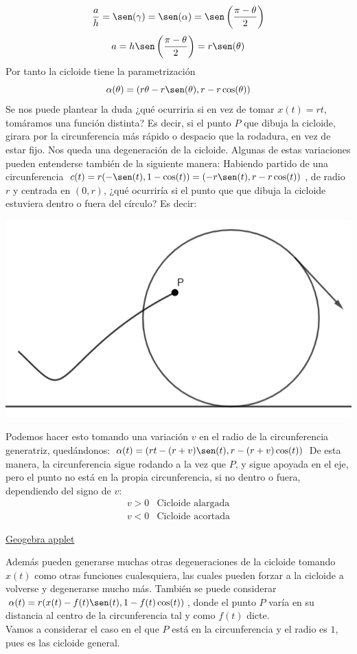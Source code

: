 \documentclass{article}
\begin{document}
$$
\frac{a}{h}=\sen(\gamma)= \sen(\alpha)=\sen\left( \frac{\pi-\theta}{2} \right)
$$
$$
a=h\sen\left( \frac{\pi-\theta}{2} \right)= r\sen(\theta)
$$
Por tanto la cicloide tiene la parametrización
$$
\alpha(\theta)=(r\theta-r\sen(\theta),r-r\cos(\theta))
$$
Se nos puede plantear la duda ¿qué ocurriria si en vez de tomar $x(t)=rt$, tomáramos una función distinta?
Es decir, si el punto $P$ que dibuja la cicloide, girara por la circunferencia más rápido o despacio que la rodadura,
en vez de estar fijo. Nos queda una degeneración de la cicloide. Algunas de estas variaciones pueden entenderse también de la
siguiente manera: Habiendo partido de una circunferencia $c(t)=r(-\sen(t),1-\cos(t))=(-r\sen(t),r-r\cos(t))$, de radio $r$
y centrada en $(0,r)$, ¿qué ocurriría si el punto que que dibuja la cicloide estuviera dentro o fuera del círculo? Es decir:\\
\begin{center}
    \includegraphics[scale=0.3]{figuras/cicloide general.PNG}
\end{center}
Podemos hacer esto tomando una variación $v$ en el radio de la circunferencia generatriz, quedándonos:
$\alpha(t)=(rt-(r+v)\sen(t),r-(r+v)\cos(t))$ De esta manera, la circunferencia sigue rodando a la vez que $P$, y sigue apoyada en el eje,
pero el punto no está en la propia circunferencia, si no dentro o fuera, dependiendo del signo de $v$:
$$
\begin{array}{ll}
    v>0 & \text{Cicloide alargada} \\
    v<0 & \text{Cicloide acortada}
\end{array}
$$
\begin{center}
    \href{https://www.geogebra.org/calculator/cen7wfhh}{Geogebra applet}
\end{center}
Además pueden generarse muchas otras degeneraciones de la cicloide tomando $x(t)$ como otras funciones cualesquiera,
las cuales pueden forzar a la cicloide a volverse y degenerarse mucho más. También se puede considerar
$\alpha(t)=r(x(t)-f(t)\sen(t),1-f(t)\cos(t))$, donde el punto $P$ varía en su distancia al centro de la circunferencia
tal y como $f(t)$ dicte.\\
Vamos a considerar el caso en el que $P$ está en la circunferencia y el radio es $1$, pues es las cicloide general.
\end{document}
